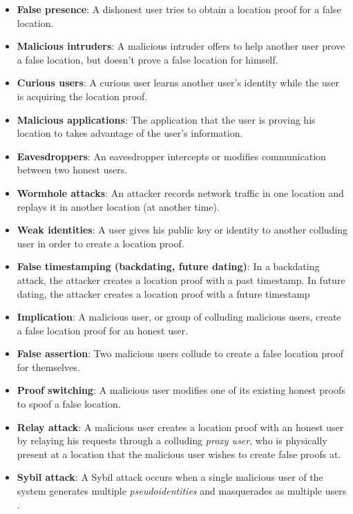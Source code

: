 \begin{itemize}
	\item[] \textbf{False presence}: A dishonest user tries to obtain a location proof for a false location.
	\item[] \textbf{Malicious intruders}: A malicious intruder offers to help another user prove a false location, but doesn't prove a false location for himself.
	\item[] \textbf{Curious users}: A curious user learns another user's identity while the user is acquiring the location proof.
	\item[] \textbf{Malicious applications}: The application that the user is proving his location to takes advantage of the user's information.
	\item[] \textbf{Eavesdroppers}: An eavesdropper intercepts or modifies communication between two honest users.
	\item[] \textbf{Wormhole attacks}: An attacker records network traffic in one location and replays it in another location (at another time).
	\item[] \textbf{Weak identities}: A user gives his public key or identity to another colluding user in order to create a location proof.
	\item[] \textbf{False timestamping (backdating, future dating)}: In a backdating attack, the attacker creates a location proof with a past timestamp. In future dating, the attacker creates a location proof with a future timestamp
	\item[] \textbf{Implication}: A malicious user, or group of colluding malicious users, create a false location proof for an honest user.
	\item[] \textbf{False assertion}: Two malicious users collude to create a false location proof for themselves.
	\item[] \textbf{Proof switching}: A malicious user modifies one of its existing honest proofs to spoof a false location.
	\item[] \textbf{Relay attack}: A malicious user creates a location proof with an honest user by relaying his requests through a colluding \textit{proxy user}, who is physically present at a location that the malicious user wishes to create false proofs at.
	\item[] \textbf{Sybil attack}: A Sybil attack occurs when a single malicious user of the system generates multiple \textit{pseudoidentities} and masquerades as multiple users \cite{sybil}.
\end{itemize}